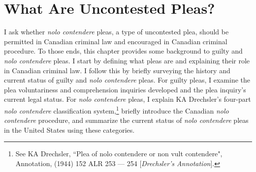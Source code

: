 \chapter{What Are Uncontested Pleas?}

\setcounter{footnote}{25}

I ask whether \textit{nolo contendere} pleas, a type of uncontested plea, should be permitted in Canadian criminal law and encouraged in Canadian criminal procedure. To those ends, this chapter provides some background to guilty and \textit{nolo contendere} pleas. I start by defining what pleas are and explaining their role in Canadian criminal law. I follow this by briefly surveying the history and current status of guilty and \textit{nolo contendere} pleas. For guilty pleas, I examine the plea voluntariness and comprehension inquiries developed and the plea inquiry's current legal status. For \textit{nolo contendere} pleas, I explain KA Drechsler's four-part \textit{nolo contendere} classification system,\footnote{See KA Drechsler, ``Plea of nolo contendere or non vult contendere", Annotation, (1944) 152 ALR 253 — 254 [\textit{Drechsler's Annotation}].} briefly introduce the Canadian \textit{nolo contendere} procedure, and summarize the current status of \textit{nolo contendere} pleas in the United States using these categories.
